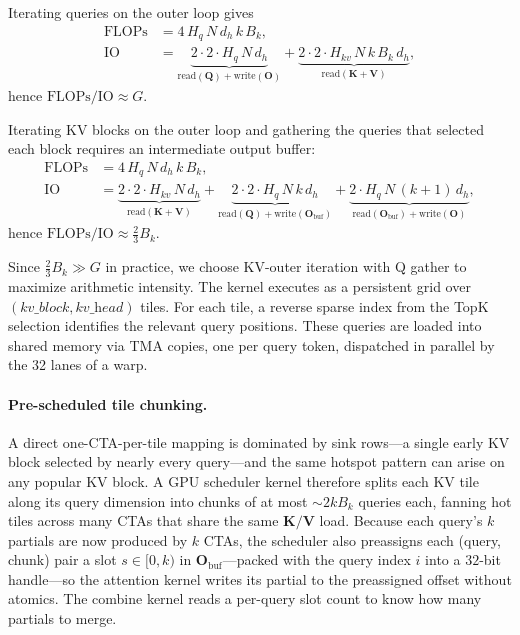 \documentclass{llmxive}
\providecommand{\bm}[1]{\boldsymbol{#1}}
\providecommand{\mK}{{\bm{K}}}
\providecommand{\mO}{{\bm{O}}}
\providecommand{\mQ}{{\bm{Q}}}
\providecommand{\mV}{{\bm{V}}}
\begin{document}
Iterating queries on the outer loop gives
\begin{align}
\mathrm{FLOPs} &= 4\, H_q\, N\, d_h\, k\, B_k, \\
\mathrm{IO}    &= \underbrace{2 \cdot 2 \cdot H_q\, N\, d_h}_{\text{read}(\mQ)+\text{write}(\mO)}
                + \underbrace{2 \cdot 2 \cdot H_{kv}\, N\, k\, B_k\, d_h}_{\text{read}(\mK+\mV)},
\end{align}
hence $\mathrm{FLOPs}/\mathrm{IO} \approx G$.

Iterating KV blocks on the outer loop and gathering the queries that selected each block requires an intermediate output buffer:
\begin{align}
\mathrm{FLOPs} &= 4\, H_q\, N\, d_h\, k\, B_k, \\
\mathrm{IO}    &= \underbrace{2 \cdot 2 \cdot H_{kv}\, N\, d_h}_{\text{read}(\mK+\mV)}
                + \underbrace{2 \cdot 2 \cdot H_q\, N\, k\, d_h}_{\text{read}(\mQ)+\text{write}(\mO_\text{buf})}
                + \underbrace{2 \cdot H_q\, N\, (k{+}1)\, d_h}_{\text{read}(\mO_\text{buf})+\text{write}(\mO)},
\end{align}
hence $\mathrm{FLOPs}/\mathrm{IO} \approx \tfrac{2}{3} B_k$.

Since $\tfrac{2}{3} B_k \gg G$ in practice, we choose KV-outer iteration with Q gather to maximize arithmetic intensity. The kernel executes as a persistent grid over $(\textit{kv\_block}, \textit{kv\_head})$ tiles. For each tile, a reverse sparse index from the TopK selection identifies the relevant query positions. These queries are loaded into shared memory via TMA copies, one per query token, dispatched in parallel by the 32 lanes of a warp.

\paragraph{Pre-scheduled tile chunking.}
A direct one-CTA-per-tile mapping is dominated by sink rows---a single early KV block selected by nearly every query---and the same hotspot pattern can arise on any popular KV block. A GPU scheduler kernel therefore splits each KV tile along its query dimension into chunks of at most $\sim\!2 k B_k$ queries each, fanning hot tiles across many CTAs that share the same $\mathbf{K}/\mathbf{V}$ load.
Because each query's $k$ partials are now produced by $k$ CTAs, the scheduler also preassigns each (query, chunk) pair a slot $s \in [0, k)$ in $\mathbf{O}_\text{buf}$---packed with the query index $i$ into a $32$-bit handle---so the attention kernel writes its partial to the preassigned offset without atomics. The combine kernel reads a per-query slot count to know how many partials to merge.
\end{document}
